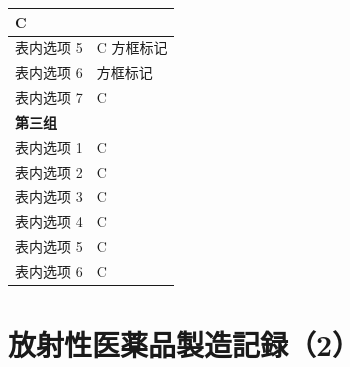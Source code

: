 \documentclass[UTF8,10pt,a4paper,fontset=fandol]{ctexart}
\newcommand{\fieldvalue}[1]{#1}
\newcommand{\handwritten}[1]{#1}
\begin{document}
\begin{tabularx}{\textwidth}{|p{}|X|}
\fieldvalue{\handwritten{C}} \\
\hline
表内选项 5 &
\fieldvalue{\handwritten{C}} \qquad
\fieldvalue{\handwritten{方框标记}} \\
\hline
表内选项 6 &
\fieldvalue{\handwritten{方框标记}} \\
\hline
表内选项 7 &
\fieldvalue{\handwritten{C}} \\
\hline
\multicolumn{2}{|l|}{\textbf{第三组}} \\
\hline
表内选项 1 &
\fieldvalue{\handwritten{C}} \\
\hline
表内选项 2 &
\fieldvalue{\handwritten{C}} \\
\hline
表内选项 3 &
\fieldvalue{\handwritten{C}} \\
\hline
表内选项 4 &
\fieldvalue{\handwritten{C}} \\
\hline
表内选项 5 &
\fieldvalue{\handwritten{C}} \\
\hline
表内选项 6 &
\fieldvalue{\handwritten{C}} \\
\hline
\end{tabularx}


\newpage

\section*{放射性医薬品製造記録（2）}
\end{document}
